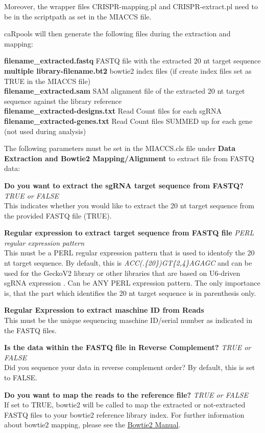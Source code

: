 \documentclass[]{article}
\begin{document}
Moreover, the wrapper files CRISPR-mapping.pl and CRISPR-extract.pl need
to be in the scriptpath as set in the MIACCS file.

caRpools will then generate the following files during the extraction
and mapping:

\textbf{filename\_extracted.fastq} FASTQ file with the extracted 20 nt
target sequence\\
\textbf{multiple library-filename.bt2} bowtie2 index files (if create
index files set as TRUE in the MIACCS file)\\
\textbf{filename\_extracted.sam} SAM alignment file of the extracted 20
nt target sequence against the library reference\\
\textbf{filename\_extracted-designs.txt} Read Count files for each
sgRNA\\
\textbf{filename\_extracted-genes.txt} Read Count files SUMMED up for
each gene (not used during analysis)

The following parameters must be set in the MIACCS.cls file under
\textbf{Data Extraction and Bowtie2 Mapping/Alignment} to extract file
from FASTQ data:

\textbf{Do you want to extract the sgRNA target sequence from FASTQ?}
\emph{TRUE or FALSE}\\
This indicates whether you would like to extract the 20 nt target
sequence from the provided FASTQ file (TRUE).

\textbf{Regular expression to extract target sequence from FASTQ file}
\emph{PERL regular expression pattern}\\
This must be a PERL regular expression pattern that is used to identofy
the 20 nt target sequence. By default, this is
\emph{ACC(.\{20\})GT\{2,4\}AGAGC} and can be used for the GeckoV2
library or other libraries that are based on U6-driven sgRNA expression
. Can be ANY PERL expression pattern. The only importance is, that the
part which identifies the 20 nt target sequence is in parenthesis only.

\textbf{Regular Expression to extract maschine ID from Reads}\\
This must be the unique sequencing maschine ID/serial number as
indicated in the FASTQ files.

\textbf{Is the data within the FASTQ file in Reverse Complement?}
\emph{TRUE or FALSE}\\
Did you sequence your data in reverse complement order? By default, this
is set to FALSE.

\textbf{Do you want to map the reads to the reference file?} \emph{TRUE
or FALSE}\\
If set to TRUE, bowtie2 will be called to map the extracted or
not-extracted FASTQ files to your bowtie2 reference library index. For
further information about bowtie2 mapping, please see the
\href{http://bowtie-bio.sourceforge.net/bowtie2/manual.shtml}{Bowtie2
Manual}.
\end{document}
